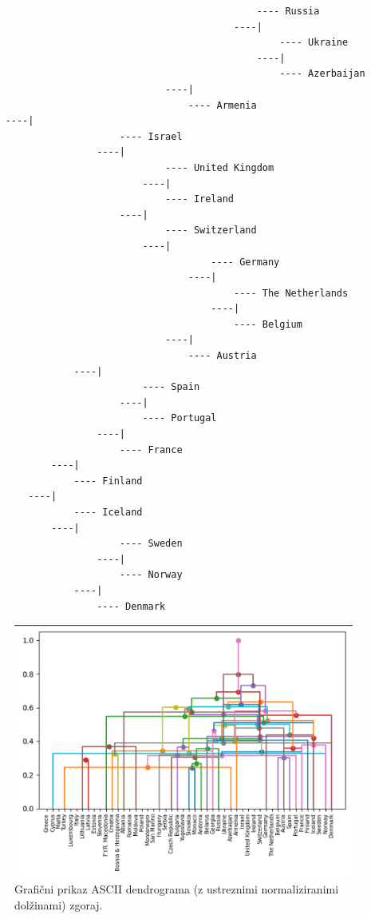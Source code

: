 \documentclass[a4paper,11pt]{article}
\begin{document}
\begin{lstlisting}
                                                ---- Russia
                                            ----|
                                                    ---- Ukraine
                                                ----|
                                                    ---- Azerbaijan
                                ----|
                                    ---- Armenia
    ----|
                        ---- Israel
                    ----|
                                ---- United Kingdom
                            ----|
                                ---- Ireland
                        ----|
                                ---- Switzerland
                            ----|
                                        ---- Germany
                                    ----|
                                            ---- The Netherlands
                                        ----|
                                            ---- Belgium
                                ----|
                                    ---- Austria
                ----|
                            ---- Spain
                        ----|
                            ---- Portugal
                    ----|
                        ---- France
            ----|
                ---- Finland
        ----|
                ---- Iceland
            ----|
                        ---- Sweden
                    ----|
                        ---- Norway
                ----|
                    ---- Denmark
\end{lstlisting}

\newpage

\begin{figure}[h!]
\begin{center}
\includegraphics[scale=0.3]{graphical.png}
\caption{Grafični prikaz ASCII dendrograma (z ustreznimi normaliziranimi dolžinami) zgoraj.}
\label{slika2}
\end{center}
\end{figure}
\end{document}
